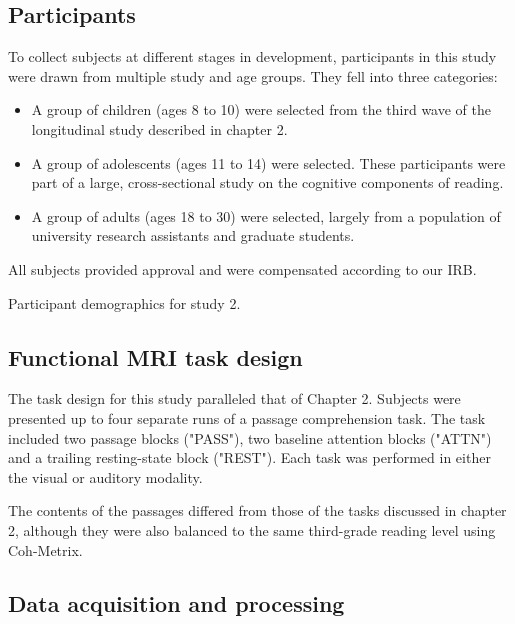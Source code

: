 \subsection{Participants}

To collect subjects at different stages in development, participants in this study were drawn from multiple study and age groups. They fell into three categories:

\begin{itemize}
	\item A group of children (ages 8 to 10) were selected from the third wave of the longitudinal study described in chapter 2. 
	\item A group of adolescents (ages 11 to 14) were selected. These participants were part of a large, cross-sectional study on the cognitive components of reading.
	\item A group of adults (ages 18 to 30) were selected, largely from a population of university research assistants and graduate students.
\end{itemize}

All subjects provided approval and were compensated according to our IRB.

\begin{table}[t]
	\renewcommand{\tabcolsep}{0.09cm}
	\centering
	
	\caption{Participant demographics for study 2.}
	\label{table:ch3-participants}
\end{table}

\subsection{Functional MRI task design}

The task design for this study paralleled that of Chapter 2. Subjects were presented up to four separate runs of a passage comprehension task. The task included two passage blocks ("PASS"), two baseline attention blocks ("ATTN") and a trailing resting-state block ("REST"). Each task was performed in either the visual or auditory modality.

The contents of the passages differed from those of the tasks discussed in chapter 2, although they were also balanced to the same third-grade reading level using Coh-Metrix. 

\subsection{Data acquisition and processing}

